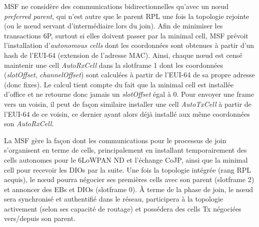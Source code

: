 \documentclass[]{report}
\begin{document}
\vspace{0.4cm}

\par MSF ne considère des communications bidirectionnelles qu'avec un nœud \textit{preferred parent}, qui n'est autre que le parent RPL une fois la topologie rejointe (ou le nœud servant d'intermédiaire lors du join). Afin de minimiser les transactions 6P, surtout si elles doivent passer par la minimal cell, MSF prévoit l'installation d'\textit{autonomous cells} dont les coordonnées sont obtenues à partir d'un hash de l'EUI-64 (extension de l'adresse MAC). Ainsi, chaque nœud est censé maintenir une cell \textit{AutoRxCell} dans la slotframe 1 dont les coordonnées (\textit{slotOffset}, \textit{channelOffset}) sont calculées à partir de l'EUI-64 de sa propre adresse (donc fixes). Le calcul tient compte du fait que la minimal cell est installée d'office et ne retourne donc jamais un \textit{slotOffset} égal à 0. Pour envoyer une frame vers un voisin, il peut de façon similaire installer une cell \textit{AutoTxCell} à partir de l'EUI-64 de ce voisin, ce dernier ayant alors déjà installé aux même coordonnées son \textit{AutoRxCell}.\\

\par La MSF gère la façon dont les communications pour le processus de join s'organisent en terme de cells, principalement en installant temporairement des cells autonomes pour le 6LoWPAN ND et l'échange CoJP, ainsi que la minimal cell pour recevoir les DIOs par la suite. Une fois la topologie intégrée (rang RPL acquis), le nœud pourra négocier ses premières cells avec son parent (slotframe 2) et annoncer des EBs et DIOs (slotframe 0). À terme de la phase de join, le nœud sera synchronisé et authentifié dans le réseau, participera à la topologie activement (selon ses capacité de routage) et possédera des cells Tx négociées vers/depuis son parent.\\
\end{document}
